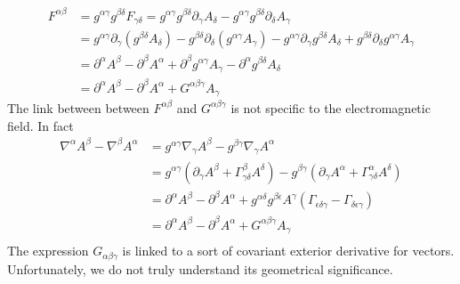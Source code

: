 \begin{equation}
	\begin{aligned}
		F^{\alpha\beta} &= g^{\alpha\gamma}g^{\beta\delta} F_{\gamma\delta} = g^{\alpha\gamma}g^{\beta\delta} \partial_\gamma A_{\delta} - g^{\alpha\gamma}g^{\beta\delta} \partial_\delta A_{\gamma}  \\
		&= g^{\alpha\gamma} \partial_\gamma (g^{\beta\delta} A_{\delta}) - g^{\beta\delta} \partial_\delta ( g^{\alpha\gamma}A_{\gamma}) - g^{\alpha\gamma} \partial_\gamma g^{\beta\delta} A_{\delta} + g^{\beta\delta} \partial_\delta g^{\alpha\gamma}A_{\gamma}\\
		&= \partial^\alpha A^\beta - \partial^\beta A^\alpha + \partial ^\beta g^{\alpha \gamma} A_\gamma - \partial^\alpha g^{\beta \delta} A_\delta\\
		&= \partial^\alpha A^\beta - \partial^\beta A^\alpha +G^{\alpha\beta\gamma} A_\gamma
	\end{aligned}
\end{equation}
The link between between $F^{\alpha\beta}$ and $G^{\alpha\beta\gamma}$ is not specific to the electromagnetic field. In fact
\begin{equation}
	\begin{aligned}
		\nabla^\alpha A^\beta - \nabla^\beta A^\alpha &= g^{\alpha\gamma} \nabla_\gamma A^\beta - g^{\beta\gamma} \nabla_\gamma A^\alpha \\
&= g^{\alpha\gamma} (\partial_\gamma A^\beta + \Gamma^\beta_{\gamma\delta} A^\delta) - g^{\beta\gamma} (\partial_\gamma A^\alpha + \Gamma^\alpha_{\gamma\delta} A^\delta) \\
&= \partial^\alpha A^\beta - \partial^\beta A^\alpha + g^{\alpha\delta} g^{\beta\epsilon} A^\gamma( \Gamma_{\epsilon\delta\gamma} - \Gamma_{\delta\epsilon\gamma}) \\
&= \partial^\alpha A^\beta - \partial^\beta A^\alpha + G^{\alpha\beta\gamma} A_\gamma \\
	\end{aligned}
\end{equation}
The expression $G_{\alpha\beta\gamma}$ is linked to a sort of covariant exterior derivative for vectors. Unfortunately, we do not truly understand its geometrical significance.

